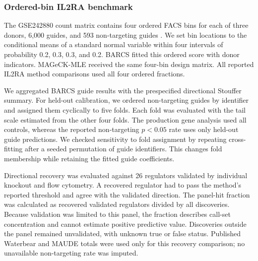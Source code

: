 \subsubsection{Ordered-bin IL2RA benchmark}

The GSE242880 count matrix contains four ordered FACS bins for each of three
donors, 6,000 guides, and 593 non-targeting guides
\citep{freimer2022il2ra,pimentel2024waterbear}.  We set bin locations to the
conditional means of a standard normal variable within four intervals of
probability 0.2, 0.3, 0.3, and 0.2.  BARCS fitted this ordered score with donor indicators.
MAGeCK-MLE received the same four-bin design matrix.  All reported IL2RA
method comparisons used all four ordered fractions.

We aggregated BARCS guide results with the prespecified directional Stouffer
summary.  For held-out calibration, we ordered non-targeting guides by
identifier and assigned them cyclically to five folds.  Each fold was
evaluated with the tail scale estimated from the other four folds.  The
production gene analysis used all controls, whereas the reported non-targeting
$p<0.05$ rate uses only held-out guide predictions.  We checked sensitivity to
fold assignment by repeating cross-fitting after a seeded permutation of guide
identifiers.  This changes fold membership while retaining the fitted guide
coefficients.

Directional recovery was evaluated against 26 regulators validated by
individual knockout and flow cytometry.  A recovered regulator had to pass the
method's reported threshold and agree with the validated direction.  The
panel-hit fraction was calculated as recovered validated regulators divided by
all discoveries.  Because validation was limited to this panel, the fraction
describes call-set concentration and cannot estimate positive predictive
value.  Discoveries outside the panel remained unvalidated, with unknown true
or false status. Published Waterbear and MAUDE totals were used only for this
recovery comparison; no unavailable non-targeting rate was imputed.
